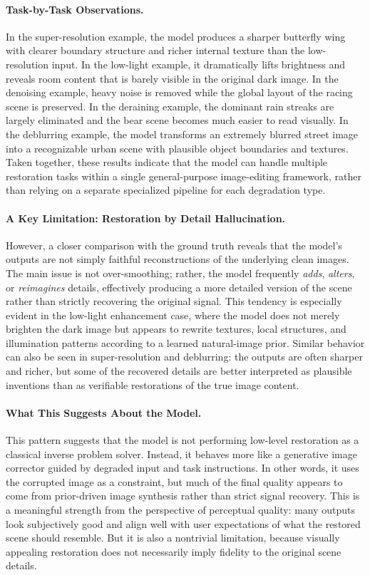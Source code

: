 \paragraph{Task-by-Task Observations.}
In the super-resolution example, the model produces a sharper butterfly wing with clearer boundary structure and richer internal texture than the low-resolution input. In the low-light example, it dramatically lifts brightness and reveals room content that is barely visible in the original dark image. In the denoising example, heavy noise is removed while the global layout of the racing scene is preserved. In the deraining example, the dominant rain streaks are largely eliminated and the bear scene becomes much easier to read visually. In the deblurring example, the model transforms an extremely blurred street image into a recognizable urban scene with plausible object boundaries and textures. Taken together, these results indicate that the model can handle multiple restoration tasks within a single general-purpose image-editing framework, rather than relying on a separate specialized pipeline for each degradation type.

\paragraph{A Key Limitation: Restoration by Detail Hallucination.}
However, a closer comparison with the ground truth reveals that the model's outputs are not simply faithful reconstructions of the underlying clean images. The main issue is not over-smoothing; rather, the model frequently \emph{adds}, \emph{alters}, or \emph{reimagines} details, effectively producing a more detailed version of the scene rather than strictly recovering the original signal. This tendency is especially evident in the low-light enhancement case, where the model does not merely brighten the dark image but appears to rewrite textures, local structures, and illumination patterns according to a learned natural-image prior. Similar behavior can also be seen in super-resolution and deblurring: the outputs are often sharper and richer, but some of the recovered details are better interpreted as plausible inventions than as verifiable restorations of the true image content.

\paragraph{What This Suggests About the Model.}
This pattern suggests that the model is not performing low-level restoration as a classical inverse problem solver. Instead, it behaves more like a generative image corrector guided by degraded input and task instructions. In other words, it uses the corrupted image as a constraint, but much of the final quality appears to come from prior-driven image synthesis rather than strict signal recovery. This is a meaningful strength from the perspective of perceptual quality: many outputs look subjectively good and align well with user expectations of what the restored scene should resemble. But it is also a nontrivial limitation, because visually appealing restoration does not necessarily imply fidelity to the original scene details.

